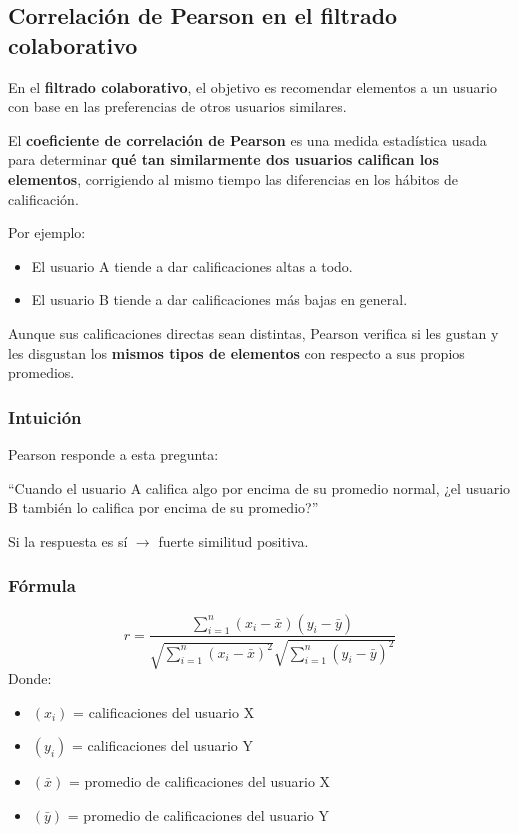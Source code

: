 \documentclass[12pt]{article}
\begin{document}
\subsection{Correlación de Pearson en el filtrado colaborativo}
En el \textbf{filtrado colaborativo}, el objetivo es recomendar elementos a un usuario con base en las preferencias de otros usuarios similares.

El \textbf{coeficiente de correlación de Pearson} es una medida estadística usada para determinar \textbf{qué tan similarmente dos usuarios califican los elementos}, corrigiendo al mismo tiempo las diferencias en los hábitos de calificación.

Por ejemplo:
\begin{itemize}
\item El usuario A tiende a dar calificaciones altas a todo.
\item El usuario B tiende a dar calificaciones más bajas en general.
\end{itemize}

Aunque sus calificaciones directas sean distintas, Pearson verifica si les gustan y les disgustan los \textbf{mismos tipos de elementos} con respecto a sus propios promedios.

\subsubsection*{Intuición}
Pearson responde a esta pregunta:

``Cuando el usuario A califica algo por encima de su promedio normal, ¿el usuario B también lo califica por encima de su promedio?''

Si la respuesta es sí $\rightarrow$ fuerte similitud positiva.

\subsubsection*{Fórmula}
\[
r=\frac{\sum_{i=1}^{n}(x_i-\bar{x})(y_i-\bar{y})}{\sqrt{\sum_{i=1}^{n}(x_i-\bar{x})^2}\sqrt{\sum_{i=1}^{n}(y_i-\bar{y})^2}}
\]
Donde:
\begin{itemize}
\item $(x_i)$ = calificaciones del usuario X
\item $(y_i)$ = calificaciones del usuario Y
\item $(\bar{x})$ = promedio de calificaciones del usuario X
\item $(\bar{y})$ = promedio de calificaciones del usuario Y
\end{itemize}
\end{document}
